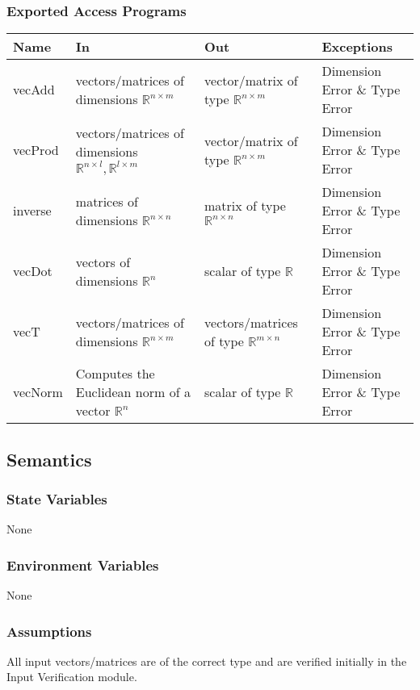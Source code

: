 \documentclass[12pt, titlepage]{article}
\begin{document}
\subsubsection{Exported Access Programs}

\begin{center}
\begin{tabular}{p{2cm} p{4cm} p{4cm} p{2cm}}
\hline
\textbf{Name} & \textbf{In} & \textbf{Out} & \textbf{Exceptions} \\
\hline
vecAdd & vectors/matrices of dimensions $\mathbb{R}^{n\times m}$ & vector/matrix of type $\mathbb{R}^{n\times m}$ & Dimension Error \& Type Error \\
vecProd & vectors/matrices of dimensions $\mathbb{R}^{n\times l},\mathbb{R}^{l\times m}$ & vector/matrix of type $\mathbb{R}^{n\times m}$ & Dimension Error \& Type Error \\
inverse & matrices of dimensions $\mathbb{R}^{n\times n}$ & matrix of type $\mathbb{R}^{n\times n}$ & Dimension Error \& Type Error \\
vecDot & vectors of dimensions $\mathbb{R}^{n}$ & scalar of type $\mathbb{R}$ & Dimension Error \& Type Error \\
vecT & vectors/matrices of dimensions $\mathbb{R}^{n \times m}$ & vectors/matrices of type $\mathbb{R}^{m \times n}$ & Dimension Error \& Type Error \\
vecNorm & Computes the Euclidean norm of a vector  $\mathbb{R}^{n}$ & scalar of type $\mathbb{R}$ & Dimension Error \& Type Error \\
\hline
\end{tabular}
\end{center}

\subsection{Semantics}
\subsubsection{State Variables}
None
\subsubsection{Environment Variables}
None

\subsubsection{Assumptions}
All input vectors/matrices are of the correct type and are verified initially in the Input Verification module.
\end{document}
